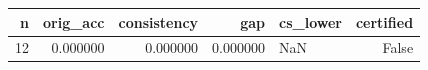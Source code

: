 \begin{tabular}{rrrrlr}
\toprule
n & orig_acc & consistency & gap & cs_lower & certified \\
\midrule
12 & 0.000000 & 0.000000 & 0.000000 & NaN & False \\
\bottomrule
\end{tabular}

